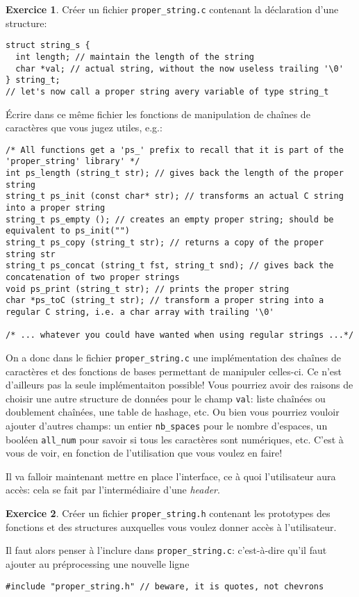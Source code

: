 \documentclass[french,a4paper]{article}
\theoremstyle{definition}
\newtheorem{exercise}{Exercice}
\theoremstyle{remark}
\newcommand{\shell}[1]{\lstinline[style={},style=sh]|#1|}
\newcommand{\inlinec}[1]{\lstinline[style=C]°#1°}
\begin{document}
\begin{exercise}
  Créer un fichier \shell{proper_string.c} contenant la déclaration
  d'une structure:
  \begin{lstlisting}
struct string_s {
  int length; // maintain the length of the string
  char *val; // actual string, without the now useless trailing '\0'
} string_t;
// let's now call a proper string avery variable of type string_t
  \end{lstlisting}
  
  \'Ecrire dans ce même fichier les fonctions de manipulation de
  chaînes de caractères que vous jugez utiles, e.g.:
  \begin{lstlisting}[breaklines=true]
/* All functions get a 'ps_' prefix to recall that it is part of the 'proper_string' library' */
int ps_length (string_t str); // gives back the length of the proper string
string_t ps_init (const char* str); // transforms an actual C string into a proper string
string_t ps_empty (); // creates an empty proper string; should be equivalent to ps_init("")
string_t ps_copy (string_t str); // returns a copy of the proper string str
string_t ps_concat (string_t fst, string_t snd); // gives back the concatenation of two proper strings
void ps_print (string_t str); // prints the proper string
char *ps_toC (string_t str); // transform a proper string into a regular C string, i.e. a char array with trailing '\0'

/* ... whatever you could have wanted when using regular strings ...*/
  \end{lstlisting}
\end{exercise}

On a donc dans le fichier \shell{proper_string.c} une implémentation
des chaînes de caractères et des fonctions de bases permettant de
manipuler celles-ci. Ce n'est d'ailleurs pas la seule implémentaiton
possible! Vous pourriez avoir des raisons de choisir une autre
structure de données pour le champ \inlinec{val}: liste chaînées ou
doublement chaînées, une table de hashage, etc. Ou bien vous pourriez
vouloir ajouter d'autres champs: un entier \inlinec{nb_spaces} pour le
nombre d'espaces, un booléen \inlinec{all_num} pour savoir si tous les
caractères sont numériques, etc. C'est à vous de voir, en fonction de
l'utilisation que vous voulez en faire!

Il va falloir maintenant mettre en place l'interface, ce à quoi
l'utilisateur aura accès: cela se fait par l'intermédiaire d'une {\em
  header}.
\begin{exercise}
  Créer un fichier \shell{proper_string.h} contenant les prototypes
  des fonctions et des structures auxquelles vous voulez donner accès
  à l'utilisateur.

  Il faut alors penser à l'inclure dans \shell{proper_string.c}:
  c'est-à-dire qu'il faut ajouter au préprocessing une nouvelle ligne
  \begin{lstlisting}
#include "proper_string.h" // beware, it is quotes, not chevrons
  \end{lstlisting}
\end{exercise}
\end{document}
